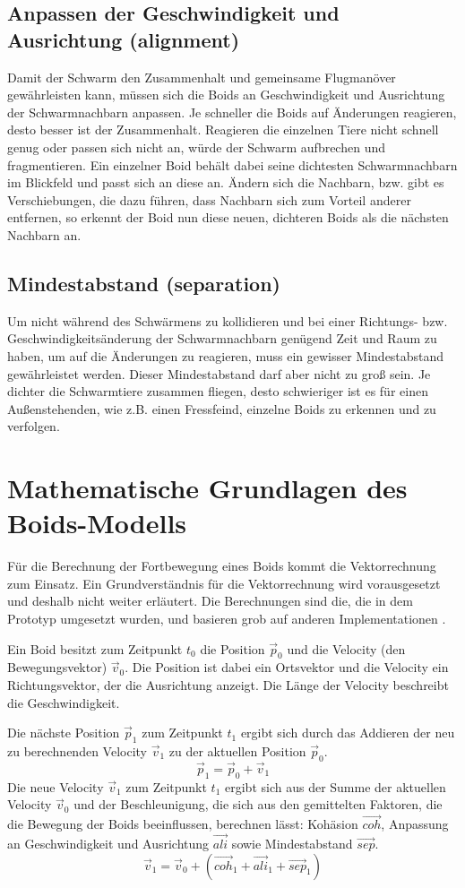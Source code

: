 \documentclass[draft=false
              ,paper=a4
              ,twoside=false
              ,fontsize=11pt
              ,headsepline
              ,BCOR10mm
              ,DIV11
              ,bibtotoc
              ,liststotoc
              ]{scrbook}
\begin{document}
\subsection{Anpassen der Geschwindigkeit und Ausrichtung (alignment)}
Damit der Schwarm den Zusammenhalt und gemeinsame Flugmanöver gewährleisten kann, müssen sich die Boids an Geschwindigkeit und Ausrichtung der Schwarmnachbarn anpassen. Je schneller die Boids auf Änderungen reagieren, desto besser ist der Zusammenhalt. Reagieren die einzelnen Tiere nicht schnell genug oder passen sich nicht an, würde der Schwarm aufbrechen und fragmentieren. Ein einzelner Boid behält dabei seine dichtesten Schwarmnachbarn im Blickfeld und passt sich an diese an. Ändern sich die Nachbarn, bzw. gibt es Verschiebungen, die dazu führen, dass Nachbarn sich zum Vorteil anderer entfernen, so erkennt der Boid nun diese neuen, dichteren Boids als die nächsten Nachbarn an.
\subsection{Mindestabstand (separation)}
Um nicht während des Schwärmens zu kollidieren und bei einer Richtungs- bzw. Geschwindigkeitsänderung der Schwarmnachbarn genügend Zeit und Raum zu haben, um auf die Änderungen zu reagieren, muss ein gewisser Mindestabstand gewährleistet werden. Dieser Mindestabstand darf aber nicht zu groß sein. Je dichter die Schwarmtiere zusammen fliegen, desto schwieriger ist es für einen Außenstehenden, wie z.B. einen Fressfeind, einzelne Boids zu erkennen und zu verfolgen.

\section{Mathematische Grundlagen des Boids-Modells}\label{mathe}
Für die Berechnung der Fortbewegung eines Boids kommt die Vektorrechnung zum Einsatz. Ein Grundverständnis für die Vektorrechnung wird vorausgesetzt und deshalb nicht weiter erläutert. Die Berechnungen sind die, die in dem Prototyp umgesetzt wurden, und basieren grob auf anderen Implementationen \cite{Bourg:2004:AGD:1096109}\cite{nature}.

Ein Boid besitzt zum Zeitpunkt \(t_0\) die Position \(\vec{p}_0\) und die Velocity (den Bewegungsvektor) \(\vec{v}_0\). Die Position ist dabei ein Ortsvektor und die Velocity ein Richtungsvektor, der die Ausrichtung anzeigt. Die Länge der Velocity beschreibt die Geschwindigkeit.

Die nächste Position \(\vec{p}_1\) zum Zeitpunkt \(t_1\) ergibt sich durch das Addieren der neu zu berechnenden Velocity \(\vec{v}_1\) zu der aktuellen Position \(\vec{p}_0\).
\[\vec{p}_1 = \vec{p}_0 + \vec{v}_1 \]
Die neue Velocity \(\vec{v}_1\) zum Zeitpunkt \(t_1\) ergibt sich aus der Summe der aktuellen Velocity \(\vec{v}_0\) und der Beschleunigung, die sich aus den gemittelten Faktoren, die die Bewegung der Boids beeinflussen, berechnen lässt: Kohäsion \(\vec{coh}\), Anpassung an Geschwindigkeit und Ausrichtung \(\vec{ali}\) sowie Mindestabstand \(\vec{sep}\).
\[\vec{v}_1 = \vec{v}_0 + (\vec{coh}_1 + \vec{ali}_1 + \vec{sep}_1)\]
\end{document}
